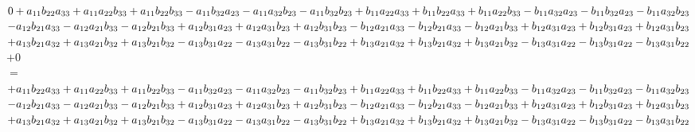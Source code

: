 \documentclass{article}
\begin{document}
$0\\+a_{11}b_{22}a_{33} +a_{11}a_{22}b_{33}
+a_{11}b_{22}b_{33}\\ -a_{11}b_{32}a_{23} -a_{11}a_{32}b_{23}
-a_{11}b_{32}b_{23}\\
+b_{11}a_{22}a_{33} +b_{11}b_{22}a_{33} +b_{11}a_{22}b_{33}\\
-b_{11}a_{32}a_{23} -b_{11}b_{32}a_{23} -b_{11}a_{32}b_{23}$\\

$-a_{12}b_{21}a_{33} -a_{12}a_{21}b_{33}
-a_{12}b_{21}b_{33}\\ +a_{12}b_{31}a_{23} +a_{12}a_{31}b_{23}
+a_{12}b_{31}b_{23}\\
-b_{12}a_{21}a_{33} -b_{12}b_{21}a_{33} -b_{12}a_{21}b_{33}
\\ +b_{12}a_{31}a_{23} +b_{12}b_{31}a_{23} +b_{12}a_{31}b_{23}$\\

$+a_{13}b_{21}a_{32} +a_{13}a_{21}b_{32}
+a_{13}b_{21}b_{32}\\ -a_{13}b_{31}a_{22} -a_{13}a_{31}b_{22}
-a_{13}b_{31}b_{22}\\
+b_{13}a_{21}a_{32} +b_{13}b_{21}a_{32} +b_{13}a_{21}b_{32}
\\ -b_{13}a_{31}a_{22} -b_{13}b_{31}a_{22} -b_{13}a_{31}b_{22}$\\
$+ 0$\\
$=$\\
$+a_{11}b_{22}a_{33} +a_{11}a_{22}b_{33}
+a_{11}b_{22}b_{33}\\ -a_{11}b_{32}a_{23} -a_{11}a_{32}b_{23}
-a_{11}b_{32}b_{23}\\
+b_{11}a_{22}a_{33} +b_{11}b_{22}a_{33} +b_{11}a_{22}b_{33}\\
-b_{11}a_{32}a_{23} -b_{11}b_{32}a_{23} -b_{11}a_{32}b_{23}$\\

$-a_{12}b_{21}a_{33} -a_{12}a_{21}b_{33}
-a_{12}b_{21}b_{33}\\ +a_{12}b_{31}a_{23} +a_{12}a_{31}b_{23}
+a_{12}b_{31}b_{23}\\
-b_{12}a_{21}a_{33} -b_{12}b_{21}a_{33} -b_{12}a_{21}b_{33}
\\ +b_{12}a_{31}a_{23} +b_{12}b_{31}a_{23} +b_{12}a_{31}b_{23}$\\

$+a_{13}b_{21}a_{32} +a_{13}a_{21}b_{32}
+a_{13}b_{21}b_{32}\\ -a_{13}b_{31}a_{22} -a_{13}a_{31}b_{22}
-a_{13}b_{31}b_{22}\\
+b_{13}a_{21}a_{32} +b_{13}b_{21}a_{32} +b_{13}a_{21}b_{32}
\\ -b_{13}a_{31}a_{22} -b_{13}b_{31}a_{22} -b_{13}a_{31}b_{22}$\\
\end{document}
